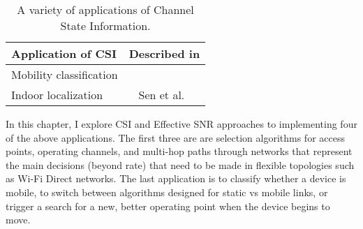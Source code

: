 \begin{table}[htp]
	\centering
	\begin{tabular}{lc}
	\toprule
		\textbf{Application of CSI} & \textbf{Described in} \\
	\midrule
		Mobility classification & \secref{sec:esnr_mobility}\\
		Indoor localization & Sen et al.~\cite{Sen_PinLoc,Sen_SpinLoc} \\ 
	\bottomrule
	\end{tabular}
	\caption[A variety of applications of Channel State Information]{\label{tab:csi_uses}A variety of applications of Channel State Information.}
\end{table}

In this chapter, I explore CSI and Effective SNR approaches to implementing four of the above applications. The first three are are selection algorithms for access points, operating channels, and multi-hop paths through networks that represent the main decisions (beyond rate) that need to be made in flexible topologies such as Wi-Fi Direct networks. The last application is to classify whether a device is mobile, to switch between algorithms designed for static vs mobile links, or trigger a search for a new, better operating point when the device begins to move.







\ifx\mainfile\undefined

\fi